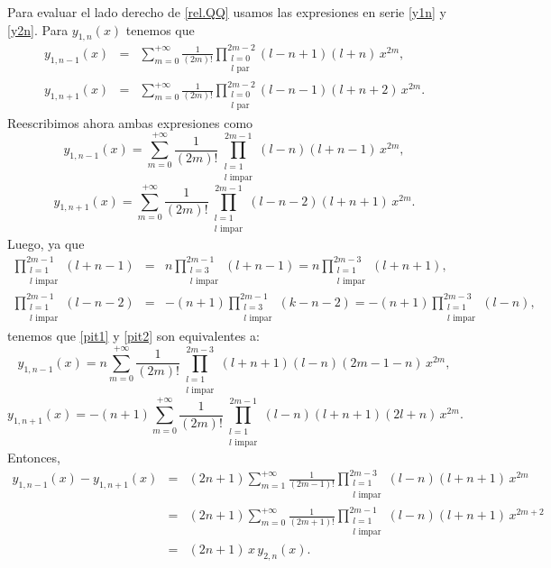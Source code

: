 Para evaluar el lado derecho de \eqref{rel.QQ} usamos las expresiones en serie \eqref{y1n} y \eqref{y2n}. Para $y_{1,n}(x)$ tenemos que
\begin{eqnarray}
y_{1,n-1}(x)&=&\sum_{m= 0}^{+\infty}\frac{1}{(2m)!}
\prod_{\substack{l=0 \\ l \text{ par}}}^{2m-2}
(l-n+1)(l+n)\,x^{2m} ,\\
y_{1,n+1}(x)&=&\sum_{m= 0}^{+\infty}\frac{1}{(2m)!}
\prod_{\substack{l=0 \\ l \text{ par}}}^{2m-2}
(l-n-1)(l+n+2)\,x^{2m}.
\end{eqnarray}
Reescribimos ahora ambas expresiones como
\begin{equation}\label{pit1}
y_{1,n-1}(x)=\sum_{m= 0}^{+\infty}\frac{1}{(2m)!}
\prod_{\substack{l=1 \\ l \text{ impar}}}^{2m-1} 
(l-n)(l+n-1)\,x^{2m},
\end{equation}
\begin{equation}
y_{1,n+1}(x)=\sum_{m= 0}^{+\infty}\frac{1}{(2m)!}
\prod_{\substack{l=1 \\ l \text{ impar}}}^{2m-1}
(l-n-2)(l+n+1)\,x^{2m}. \label{pit2}
\end{equation}
Luego, ya que
\begin{eqnarray}
\prod_{\substack{l=1 \\ l \text{ impar}}}^{2m-1}(l+n-1)&=&n\prod_{\substack{l=3 \\ l \text{ impar}}}^{2m-1}(l+n-1)=n\prod_{\substack{l=1 \\ l \text{ impar}}}^{2m-3}(l+n+1),\\
\prod_{\substack{l=1 \\ l \text{ impar}}}^{2m-1}(l-n-2)&=&-(n+1)\prod_{\substack{l=3 \\ l \text{ impar}}}^{2m-1}(k-n-2)=-(n+1)\prod_{\substack{l=1 \\ l \text{ impar}}}^{2m-3}(l-n),
\end{eqnarray}
tenemos que \eqref{pit1} y \eqref{pit2} son equivalentes a:
\begin{equation}
y_{1,n-1}(x)=n\sum_{m= 0}^{+\infty}\frac{1}{(2m)!}
\prod_{\substack{l=1 \\ l \text{ impar}}}^{2m-3} 
(l+n+1)(l-n)(2m-1-n)\,x^{2m},
\end{equation}
\begin{equation}
y_{1,n+1}(x)=-(n+1)\sum_{m= 0}^{+\infty}\frac{1}{(2m)!}
\prod_{\substack{l=1 \\ l \text{ impar}}}^{2m-1}
(l-n)(l+n+1)(2l+n)\,x^{2m}.
\end{equation}
Entonces, 
\begin{eqnarray}
y_{1,n-1}(x)-y_{1,n+1}(x)&=&(2n+1)\sum_{m= 1}^{+\infty}\frac{1}{(2m-1)!}
\prod_{\substack{l=1 \\ l \text{ impar}}}^{2m-3}
(l-n)(l+n+1)\,x^{2m}\\
&=& (2n+1)\sum_{m= 0}^{+\infty}\frac{1}{(2m+1)!}
\prod_{\substack{l=1 \\ l \text{ impar}}}^{2m-1}
(l-n)(l+n+1)\,x^{2m+2}\\
&=& (2n+1)\,x\,y_{2,n}(x) .\label{uno}
\end{eqnarray}

